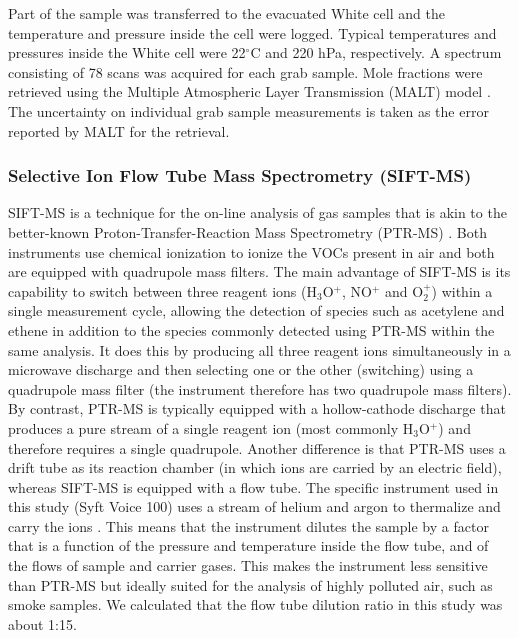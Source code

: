 \documentclass[acp, manuscript]{copernicus}
\begin{document}
Part of the sample was transferred to the evacuated White cell and the temperature and pressure inside the cell were logged. Typical temperatures and pressures inside the White cell were 22$^\circ$C and 220 hPa, respectively. A spectrum consisting of 78 scans was acquired for each grab sample. Mole fractions were retrieved using the Multiple Atmospheric Layer Transmission (MALT) model \citep{Griffith1996,Griffith2012}. The uncertainty on individual grab sample measurements is taken as the error reported by MALT for the retrieval. 
 

\subsubsection{Selective Ion Flow Tube Mass Spectrometry (SIFT-MS)}
SIFT-MS is a technique for the on-line analysis of gas samples that is akin to the better-known Proton-Transfer-Reaction Mass Spectrometry (PTR-MS) \citep{Blake2009}. Both instruments use chemical ionization to ionize the VOCs present in air and both are equipped with quadrupole mass filters. The main advantage of SIFT-MS is its capability to switch between three reagent ions (H$_3$O$^+$, NO$^+$ and O$_{2}^+$) within a single measurement cycle, allowing the detection of species such as acetylene and ethene in addition to the species commonly detected using PTR-MS within the same analysis. It does this by producing all three reagent ions simultaneously in a microwave discharge and then selecting one or the other (switching) using a quadrupole mass filter (the instrument therefore has two quadrupole mass filters). By contrast, PTR-MS is typically equipped with a hollow-cathode discharge that produces a pure stream of a single reagent ion (most commonly H$_3$O$^+$) and therefore requires a single quadrupole. 
Another difference is that PTR-MS uses a drift tube as its reaction chamber (in which ions are carried by an electric field), whereas SIFT-MS is equipped with a flow tube. The specific instrument used in this study (Syft Voice 100) uses a stream of helium and argon to thermalize and carry the ions \citep{Milligan2007}. 
This means that the instrument dilutes the sample by a factor that is a function of the pressure and temperature inside the flow tube, and of the flows of sample and carrier gases. This makes the instrument less sensitive than PTR-MS \citep{Blake2009} but ideally suited for the analysis of highly polluted air, such as smoke samples. We calculated that the flow tube dilution ratio in this study was about 1:15.  
\end{document}
